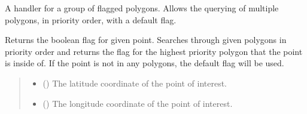 \documentclass[letterpaper,10pt,english]{sphinxmanual}
\begin{document}
\begin{fulllineitems}
\label{\detokenize{modules/gps/zones:qnav.gps.zones.FlaggedPolygonGroup}}
\pysigstartsignatures
{}
\pysigstopsignatures
\sphinxAtStartPar
A handler for a group of flagged polygons.
Allows the querying of multiple polygons, in priority order,
with a default flag.

\begin{fulllineitems}
\label{\detokenize{modules/gps/zones:qnav.gps.zones.FlaggedPolygonGroup.get_point_flag}}
\pysigstartsignatures
{}
\pysigstopsignatures
\sphinxAtStartPar
Returns the boolean flag for given point.
Searches through given polygons in priority order and returns the
flag for the highest priority polygon that the point is inside of.
If the point is not in any polygons, the default flag will be used.
\begin{quote}\begin{description}
\begin{itemize}
\item {} 
\sphinxAtStartPar
{} () \textendash{} The latitude coordinate of the point of interest.

\item {} 
\sphinxAtStartPar
{} () \textendash{} The longitude coordinate of the point of interest.

\end{itemize}


\end{description}
\end{quote}
\end{fulllineitems}
\end{fulllineitems}
\end{document}
